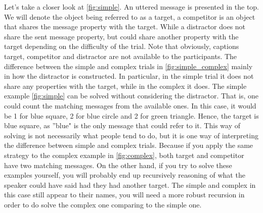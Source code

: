 \documentclass[11pt,a4paper]{article}
\begin{document}
Let's take a closer look at \autoref{fig:simple}. An uttered message is presented in the top. We will denote the object being referred to as a target, a competitor is an object that shares the message property with the target. While a distractor does not share the sent message property, but could share another property with the target depending on the difficulty of the trial. Note that obviously, captions target, competitor and distractor are not available to the participants. The difference between the simple and complex trials in \autoref{fig:simple_complex} mainly in how the distractor is constructed. In particular, in the simple trial it does not share any properties with the target, while in the complex it does. The simple example \autoref{fig:simple} can be solved without considering the distractor. That is, one could count the matching messages from the available ones. In this case, it would be 1 for blue square, 2 for blue circle and 2 for green triangle. Hence, the target is blue square, as ''blue" is the only message that could refer to it. This way of solving is not necessarily what people tend to do, but it is one way of interpreting the difference between simple and complex trials. Because if you apply the same strategy to the complex example in \autoref{fig:complex}, both target and competitor have two matching messages. On the other hand, if you try to solve these examples yourself, you will probably end up recursively reasoning of what the speaker could have said had they had another target. The simple and complex in this case still appear to their names, you will need a more robust recursion in order to do solve the complex one comparing to the simple one.
\end{document}
